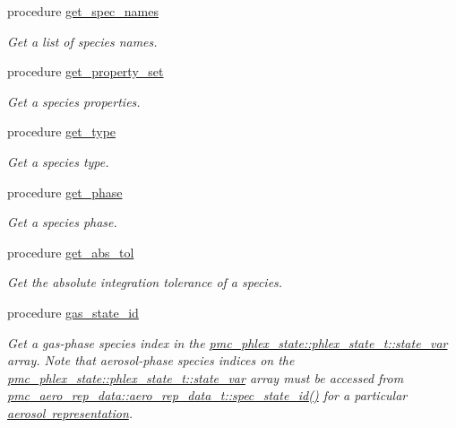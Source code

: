 \begin{DoxyCompactItemize}
procedure \mbox{\hyperlink{structpmc__chem__spec__data_1_1chem__spec__data__t_aca931c6b8ed36734d2503111adaec3f9}{get\+\_\+spec\+\_\+names}}
\begin{DoxyCompactList}\small\item\em Get a list of species names. \end{DoxyCompactList}\item 
procedure \mbox{\hyperlink{structpmc__chem__spec__data_1_1chem__spec__data__t_aecce227b9c2bbc20fbb3e47002b29703}{get\+\_\+property\+\_\+set}}
\begin{DoxyCompactList}\small\item\em Get a species properties. \end{DoxyCompactList}\item 
procedure \mbox{\hyperlink{structpmc__chem__spec__data_1_1chem__spec__data__t_a26512052ad9188877fe7207eb3e09f77}{get\+\_\+type}}
\begin{DoxyCompactList}\small\item\em Get a species type. \end{DoxyCompactList}\item 
procedure \mbox{\hyperlink{structpmc__chem__spec__data_1_1chem__spec__data__t_a2cea3052f2b2eb6b4182dcb2f78b7f75}{get\+\_\+phase}}
\begin{DoxyCompactList}\small\item\em Get a species phase. \end{DoxyCompactList}\item 
procedure \mbox{\hyperlink{structpmc__chem__spec__data_1_1chem__spec__data__t_a64a1a70b0ef5888b46487db019cb1c0e}{get\+\_\+abs\+\_\+tol}}
\begin{DoxyCompactList}\small\item\em Get the absolute integration tolerance of a species. \end{DoxyCompactList}\item 
procedure \mbox{\hyperlink{structpmc__chem__spec__data_1_1chem__spec__data__t_a50c6a5901e93ffbda0785731156c0fa3}{gas\+\_\+state\+\_\+id}}
\begin{DoxyCompactList}\small\item\em Get a gas-\/phase species index in the {\ttfamily \mbox{\hyperlink{structpmc__phlex__state_1_1phlex__state__t_a78835cb552d483ebbfc7a6bc6f756918}{pmc\+\_\+phlex\+\_\+state\+::phlex\+\_\+state\+\_\+t\+::state\+\_\+var}}} array. Note that aerosol-\/phase species indices on the {\ttfamily \mbox{\hyperlink{structpmc__phlex__state_1_1phlex__state__t_a78835cb552d483ebbfc7a6bc6f756918}{pmc\+\_\+phlex\+\_\+state\+::phlex\+\_\+state\+\_\+t\+::state\+\_\+var}}} array must be accessed from {\ttfamily \mbox{\hyperlink{structpmc__aero__rep__data_1_1aero__rep__data__t_a6dcaf48caeaaed60aa065a0fac6c7ffc}{pmc\+\_\+aero\+\_\+rep\+\_\+data\+::aero\+\_\+rep\+\_\+data\+\_\+t\+::spec\+\_\+state\+\_\+id()}}} for a particular \mbox{\hyperlink{phlex_aero_rep}{aerosol representation}}. \end{DoxyCompactList}\item 

\end{DoxyCompactItemize}
